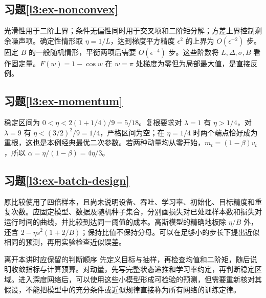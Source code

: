 \subsection*{习题\ref{l3:ex-nonconvex}}
光滑性用于二阶上界；条件无偏性同时用于交叉项和二阶矩分解；方差上界控制剩余噪声项。确定性情形取 $\eta=1/L$，达到梯度平方精度 $\epsilon^2$ 的上界为 $O(\epsilon^{-2})$ 步。固定 $B$ 的一般随机情形，平衡两项后需要 $O(\epsilon^{-4})$ 步。这些阶数将 $L,\Delta,\sigma,B$ 看作固定量。$F(w)=1-\cos w$ 在 $w=\pi$ 处梯度为零但为局部最大值，是直接反例。

\subsection*{习题\ref{l3:ex-momentum}}
稳定区间为 $0<\eta<2(1+1/4)/9=5/18$。复根要求对 $\lambda=1$ 有 $\eta>1/4$，对 $\lambda=9$ 有 $\eta<(3/2)^2/9=1/4$，严格区间为空；在 $\eta=1/4$ 时两个端点恰好成为重根，这也是本例经典最优二次参数。若两种动量均从零开始，$m_t=(1-\beta)v_t$，所以 $\alpha=\eta/(1-\beta)=4\eta/3$。

\subsection*{习题\ref{l3:ex-batch-design}}
原比较使用了四倍样本，且尚未说明设备、吞吐、学习率、初始化、目标精度和重复次数。应固定模型、数据及随机种子集合，分别画损失对已处理样本数和损失对运行时间的曲线，并比较到达同一阈值的成本。高斯模型的精确地板除 $\eta/B$ 外，还含 $2-\eta s^2(1+2/B)$；保持比值不保持分母。可以在足够小的步长下提出近似相同的预测，再用实验检查近似误差。

\begin{coursebox}{离开本讲时应保留的判断顺序}
先定义目标与抽样，再检查均值和二阶矩，随后说明收敛指标与计算预算。对动量，先写完整状态递推和学习率约定，再判断稳定区域。进入深度网络后，可以使用这些小模型形成可检验的预测，但需要重新核对其假设，不能把模型中的充分条件或近似规律直接称为所有网络的训练定律。
\end{coursebox}
